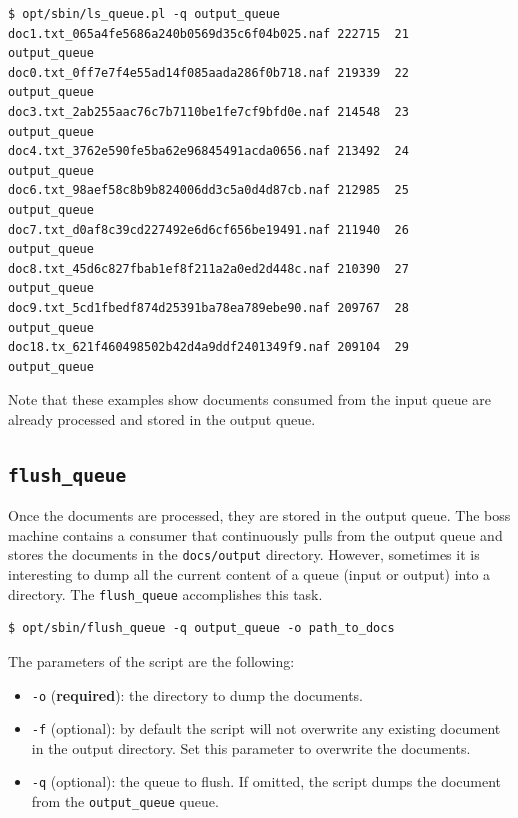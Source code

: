 \documentclass[a4]{article}
\begin{document}
\begin{verbatim}
$ opt/sbin/ls_queue.pl -q output_queue
doc1.txt_065a4fe5686a240b0569d35c6f04b025.naf 222715  21   output_queue
doc0.txt_0ff7e7f4e55ad14f085aada286f0b718.naf 219339  22   output_queue
doc3.txt_2ab255aac76c7b7110be1fe7cf9bfd0e.naf 214548  23   output_queue
doc4.txt_3762e590fe5ba62e96845491acda0656.naf 213492  24   output_queue
doc6.txt_98aef58c8b9b824006dd3c5a0d4d87cb.naf 212985  25   output_queue
doc7.txt_d0af8c39cd227492e6d6cf656be19491.naf 211940  26   output_queue
doc8.txt_45d6c827fbab1ef8f211a2a0ed2d448c.naf 210390  27   output_queue
doc9.txt_5cd1fbedf874d25391ba78ea789ebe90.naf 209767  28   output_queue
doc18.tx_621f460498502b42d4a9ddf2401349f9.naf 209104  29   output_queue
\end{verbatim}

Note that these examples show documents consumed from the input queue are
already processed and stored in the output queue.

\subsection*{\texttt{flush\_queue}}
\label{sec:flush_queue}

Once the documents are processed, they are stored in the output queue. The
boss machine contains a consumer that continuously pulls from the output
queue and stores the documents in the \texttt{docs/output}
directory. However, sometimes it is interesting to dump all the current
content of a queue (input or output) into a directory. The
\texttt{flush\_queue} accomplishes this task.

\begin{verbatim}
$ opt/sbin/flush_queue -q output_queue -o path_to_docs
\end{verbatim}

The parameters of the script are the following:
\begin{itemize}
\item \texttt{-o} (\textbf{required}): the directory to dump the documents.
\item \texttt{-f} (optional): by default the script will not overwrite any
  existing document in the output directory. Set this parameter to overwrite
  the documents.
\item \texttt{-q} (optional): the queue to flush. If omitted, the script
  dumps the document from the \texttt{output\_queue} queue.
\end{itemize}
\end{document}
